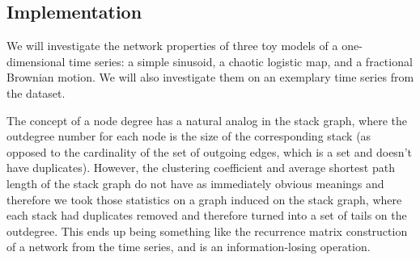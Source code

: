\documentclass[12pt]{article}
\begin{document}
\subsection{Implementation}

We will investigate the network properties of three toy models of a one-dimensional time series: a simple sinusoid, a chaotic logistic map, and a fractional Brownian motion. We will also investigate them on an exemplary time series from the dataset.

The concept of a node degree has a natural analog in the stack graph, where the outdegree number for each node is the size of the corresponding stack (as opposed to the cardinality of the set of outgoing edges, which is a set and doesn't have duplicates). However, the clustering coefficient and average shortest path length of the stack graph do not have as immediately obvious meanings and therefore we took those statistics on a graph induced on the stack graph, where each stack had duplicates removed and therefore turned into a set of tails on the outdegree. This ends up being something like the recurrence matrix construction\cite{recurrencegraph} of a network from the time series, and is an information-losing operation.
\end{document}
